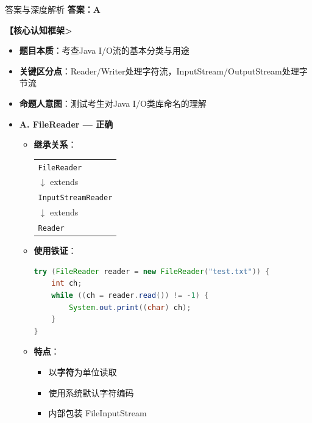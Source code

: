 \documentclass[12pt, a4paper]{ctexart}
\begin{document}
\begin{bluebox}{答案与深度解析}
	\textbf{答案：A}

	\textbf{【核心认知框架>}
	\begin{itemize}[label={}, leftmargin=*, nosep]
		\item \textbf{题目本质}：考查Java I/O流的基本分类与用途
		\item \textbf{关键区分点}：Reader/Writer处理字符流，InputStream/OutputStream处理字节流
		\item \textbf{命题人意图}：测试考生对Java I/O类库命名的理解
	\end{itemize}

	\begin{itemize}[label={}, nosep]
		\item \textbf{A. FileReader — 正确}
		\begin{itemize}[label={}, leftmargin=*, nosep]
			\item \textbf{继承关系}：
			      \begin{center}
				      \begin{tabular}{l}
					      \texttt{FileReader}        \\
					      $\downarrow$ extends       \\
					      \texttt{InputStreamReader} \\
					      $\downarrow$ extends       \\
					      \texttt{Reader}            \\
				      \end{tabular}
			      \end{center}

			\item \textbf{使用铁证}：
			      \begin{lstlisting}[language=Java]
try (FileReader reader = new FileReader("test.txt")) {
    int ch;
    while ((ch = reader.read()) != -1) {
        System.out.print((char) ch);
    }
}
      \end{lstlisting}

			\item \textbf{特点}：
			      \begin{itemize}[label={}, nosep]
				      \item 以\textbf{字符}为单位读取
				      \item 使用系统默认字符编码
				      \item 内部包装 FileInputStream
			      \end{itemize}


\end{itemize}
\end{itemize}
\end{bluebox}
\end{document}
